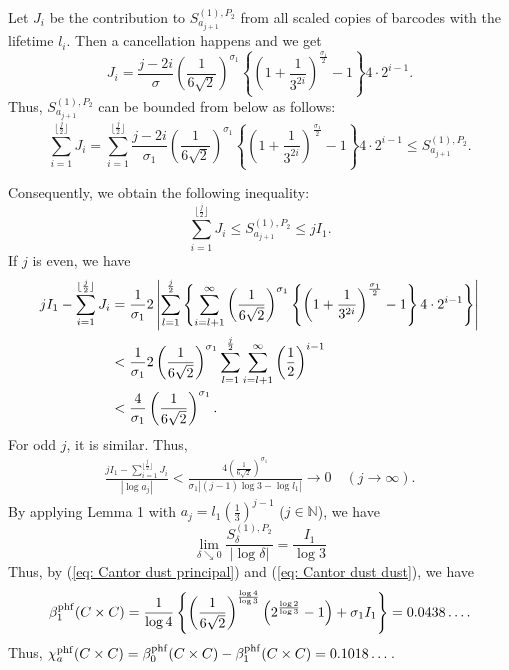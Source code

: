 \documentclass[12pt]{amsart}
\numberwithin{equation}{section}
\newcommand{\N}{\mathbb{N}}
\begin{document}
    Let $J_i$ be the contribution to $S_{a_{j+1}}^{(1),P_2}$ from all scaled copies of barcodes with the lifetime $l_i$. 
    Then a cancellation happens and we get 
    \begin{equation*}
        J_i = \frac{j-2i}{\sigma} \left(\frac{1}{6\sqrt{2}}\right)^{\sigma_1} \left\{\left(1+\frac{1}{3^{2i}}\right)^{\frac{\sigma_1}{2}}-1\right\}4\cdot 2^{i-1}.
    \end{equation*}
    Thus, $S_{a_{j+1}}^{(1),P_2}$ can be bounded from below as follows:
    \begin{equation*}
        \sum_{i=1}^{\lfloor\frac{j}{2} \rfloor} J_i = \sum_{i=1}^{\lfloor\frac{j}{2} \rfloor} \frac{j-2i}{\sigma_1} \left(\frac{1}{6\sqrt{2}}\right)^{\sigma_1} \left\{\left(1+\frac{1}{3^{2i}}\right)^{\frac{\sigma_1}{2}}-1\right\}4\cdot 2^{i-1}
        \leq S_{a_{j+1}}^{(1),P_2}.
    \end{equation*}

    Consequently, we obtain the following inequality:
    \begin{equation*}
        \sum_{i=1}^{\lfloor\frac{j}{2} \rfloor} J_i \leq S_{a_{j+1}}^{(1),P_2} \leq {j I_1}.
    \end{equation*}
    If $j$ is even, we have
    \begin{align*}
        jI_1 - \sum_{i=1}^{\lfloor\frac{j}{2} \rfloor} J_i 
        &= \frac{1}{\sigma_1} 2\left|\sum_{l=1}^{\frac{j}{2}}\left\{ \sum_{i=l+1}^{\infty} \left(\frac{1}{6\sqrt{2}}\right)^{\sigma_1} \left\{\left(1+\frac{1}{3^{2i}}\right)^{\frac{\sigma_1}{2}} - 1\right\}4 \cdot 2^{i-1} \right\}\right| \\
        &< \frac{1}{\sigma_1} 2 \left(\frac{1}{6\sqrt{2}}\right)^{\sigma_1} \sum_{l=1}^{\frac{j}{2}} \sum_{i=l+1}^{\infty} \left(\frac{1}{2}\right)^{i-1}\notag\\
        &< \frac{4}{\sigma_1} \left(\frac{1}{6\sqrt{2}}\right)^{\sigma_1}.
    \end{align*}
    For odd $j$, it is similar. 
    Thus,
    \begin{align*}
        \frac{jI_1 - \sum_{i=1}^{\lfloor\frac{j}{2} \rfloor} J_i}{\left|\log a_j\right|}
        < \frac{4 \left(\frac{1}{6\sqrt{2}}\right)^{\sigma_1}}{\sigma_1 \left| (j-1) \log 3 - \log l_1\right|}
        \rightarrow 0 \quad (j \rightarrow \infty).
    \end{align*}
    By applying Lemma 1 with $a_j = l_1 \left(\frac{1}{3}\right)^{j-1}$ ($j\in \N$), we have
    \begin{equation}
        \lim_{\delta \searrow 0} \frac{S_\delta^{(1), P_2}}{\left|\log \delta\right|} = \frac{I_1}{\log 3}
        \label{eq: Cantor dust dust}
    \end{equation}
    Thus, by (\ref{eq: Cantor dust principal}) and (\ref{eq: Cantor dust dust}), we have
    \begin{equation*}
        \beta_1^{\rm phf} (C \times C) = \frac{1}{\log 4}\left\{\left(\frac{1}{6\sqrt{2}}\right)^{\frac{\log 4}{\log 3}}\left(2^{\frac{\log 2}{\log 3}} - 1\right) + \sigma_1 I_1\right\} = 0.0438\dots.
    \end{equation*}
    Thus, $\chi_a^{\rm phf}(C \times C) = \beta_0^{\rm phf}(C \times C) - \beta_1^{\rm phf} (C \times C)=0.1018\dots$.
\end{document}
